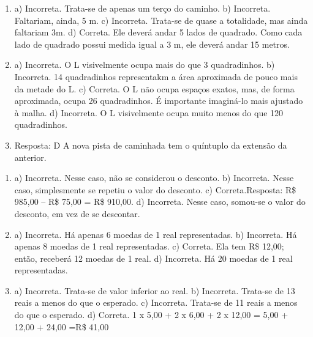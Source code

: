 
\begin{enumerate}
\item
a) Incorreta. Trata-se de apenas um terço do caminho.
b) Incorreta. Faltariam, ainda, 5 m.
c) Incorreta. Trata-se de quase a totalidade, mas ainda faltariam 3m.
d) Correta. Ele deverá andar 5 lados de quadrado. Como cada lado de quadrado possui
medida igual a 3 m, ele deverá andar 15 metros.

\item
a) Incorreta. O L visivelmente ocupa mais do que 3 quadradinhos.
b) Incorreta. 14 quadradinhos representakm a área aproximada de pouco mais da metade do L.
c) Correta. O L não ocupa espaços exatos, mas, de forma aproximada, ocupa 26 quadradinhos. É importante imaginá-lo mais ajustado à malha.
d) Incorreta. O L visivelmente ocupa muito menos do que 120 quadradinhos.

\item
Resposta: D
A nova pista de caminhada tem o quíntuplo da extensão da anterior.
\end{enumerate}


\begin{enumerate}
\item
a) Incorreta. Nesse caso, não se considerou o desconto.
b) Incorreta. Nesse caso, simplesmente se repetiu o valor do desconto.
c) Correta.Resposta: R\$ 985,00 -- R\$ 75,00 = R\$ 910,00.
d) Incorreta. Nesse caso, somou-se o valor do desconto, em vez de se descontar.

\item
a) Incorreta. Há apenas 6 moedas de 1 real representadas.
b) Incorreta. Há apenas 8 moedas de 1 real representadas.
c) Correta. Ela tem R\$ 12,00; então, receberá 12 moedas de 1 real.
d) Incorreta. Há 20 moedas de 1 real representadas.

\item
a) Incorreta. Trata-se de valor inferior ao real.
b) Incorreta. Trata-se de 13 reais a menos do que o esperado.
c) Incorreta. Trata-se de 11 reais a menos do que o esperado.
d) Correta.
1 x 5,00 + 2 x 6,00 + 2 x 12,00 = 5,00 + 12,00 + 24,00 =R\$ 41,00
\end{enumerate}


